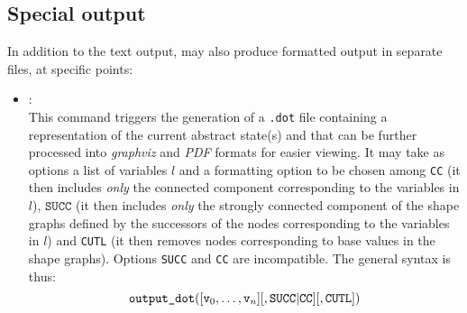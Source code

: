 \subsection{Special output}
In addition to the text output, \memcad may also produce formatted
output in separate files, at specific points:
\begin{itemize}
\item[\dcommand{output\_dot}]: \\
  This command triggers the generation of a \texttt{.dot} file containing
  a representation of the current abstract state(s) and that can be
  further processed into {\em graphviz} and {\em PDF} formats for
  easier viewing.
  It may take as options a list of variables \( l \) and a formatting
  option to be chosen among \texttt{CC} (it then includes {\em only}
  the connected component corresponding to the variables in \( l \)),
  \( \texttt{SUCC} \) (it then includes {\em only} the strongly connected
  component of the shape graphs defined by the successors of the nodes
  corresponding to the variables in \( l \)) and \texttt{CUTL} (it then
  removes nodes corresponding to base values in the shape graphs).
  Options \texttt{SUCC} and \texttt{CC} are incompatible.
  The general syntax is thus:
  \[
  \texttt{output\_dot}( [ \texttt{v}_0, \ldots, \texttt{v}_n ]
  [, \texttt{SUCC} | \texttt{CC} ] [, \texttt{CUTL} ] )
  \]
\end{itemize}

